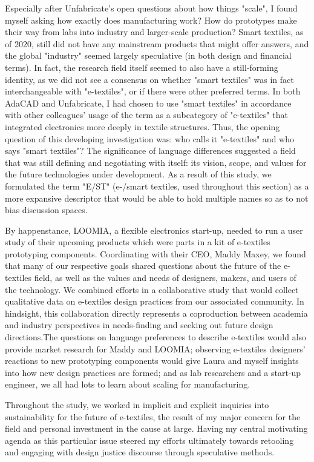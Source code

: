 Especially after Unfabricate's open questions about how things "scale", I found myself asking how exactly does manufacturing work? How do prototypes make their way from labs into industry and larger-scale production? Smart textiles, as of 2020, still did not have any mainstream products that might offer answers, and the global "industry" seemed largely speculative (in both design and financial terms). In fact, the research field itself seemed to also have a still-forming identity, as we did not see a consensus on whether "smart textiles" was in fact interchangeable with "e-textiles", or if there were other preferred terms. In both AdaCAD and Unfabricate, I had chosen to use "smart textiles" in accordance with other colleagues' usage of the term as a subcategory of "e-textiles" that integrated electronics more deeply in textile structures. Thus, the opening question of this developing investigation was: who calls it "e-textiles" and who says "smart textiles"? The significance of language differences suggested a field that was still defining and negotiating with itself: its vision, scope, and values for the future technologies under development. As a result of this study, we formulated the term "E/ST" (e-/smart textiles, used throughout this section) as a more expansive descriptor that would be able to hold multiple names so as to not bias discussion spaces.

By happenstance, LOOMIA, a flexible electronics start-up, needed to run a user study of their upcoming products which were parts in a kit of e-textiles prototyping components. Coordinating with their CEO, Maddy Maxey, we found that many of our respective goals shared questions about the future of the e-textiles field, as well as the values and needs of designers, makers, and users of the technology. We combined efforts in a collaborative study that would collect qualitative data on e-textiles design practices from our associated community. In hindsight, this collaboration directly represents a coproduction between academia and industry perspectives in needs-finding and seeking out future design directions.The questions on language preferences to describe e-textiles would also provide market research for Maddy and LOOMIA; observing e-textiles designers' reactions to new prototyping components would give Laura and myself insights into how new design practices are formed; and as lab researchers and a start-up engineer, we all had lots to learn about scaling for manufacturing. 

Throughout the study, we worked in implicit and explicit inquiries into sustainability for the future of e-textiles, the result of my major concern for the field and personal investment in the cause at large. Having my central motivating agenda as this particular issue steered my efforts ultimately towards retooling and engaging with design justice discourse through speculative methods. 

